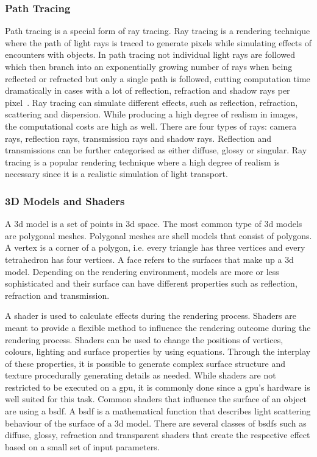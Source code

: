 \subsubsection{Path Tracing}
Path tracing is a special form of ray tracing. Ray tracing is a rendering technique where the path of light rays is traced to generate pixels while simulating effects of encounters with objects. In path tracing not individual light rays are followed which then branch into an exponentially growing number of rays when being reflected or refracted but only a single path is followed, cutting computation time dramatically in cases with a lot of reflection, refraction and shadow rays per pixel~\cite{Kajiya1986TheEquation}. Ray tracing can simulate different effects, such as reflection, refraction, scattering and dispersion. While producing a high degree of realism in images, the computational costs are high as well. There are four types of rays: camera rays, reflection rays, transmission rays and shadow rays. Reflection and transmissions can be further categorised as either diffuse, glossy or singular. Ray tracing is a popular rendering technique where a high degree of realism is necessary since it is a realistic simulation of light transport.

\subsubsection{3D Models and Shaders}
A \gls{3d} model is a set of points in \gls{3d} space. The most common type of \gls{3d} models are polygonal meshes. Polygonal meshes are shell models that consist of polygons. A vertex is a corner of a polygon, i.e. every triangle has three vertices and every tetrahedron has four vertices. A face refers to the surfaces that make up a \gls{3d} model. Depending on the rendering environment, models are more or less sophisticated and their surface can have different properties such as reflection, refraction and transmission.

A shader is used to calculate effects during the rendering process. Shaders are meant to provide a flexible method to influence the rendering outcome during the rendering process. Shaders can be used to change the positions of vertices, colours, lighting and surface properties by using equations. Through the interplay of these properties, it is possible to generate complex surface structure and texture procedurally generating details as needed. While shaders are not restricted to be executed on a \gls{gpu}, it is commonly done since a \gls{gpu}'s hardware is well suited for this task.
Common shaders that influence the surface of an object are using a \gls{bsdf}. A \gls{bsdf} is a mathematical function that describes light scattering behaviour of the surface of a \gls{3d} model. There are several classes of \glspl{bsdf} such as diffuse, glossy, refraction and transparent shaders that create the respective effect based on a small set of input parameters.

